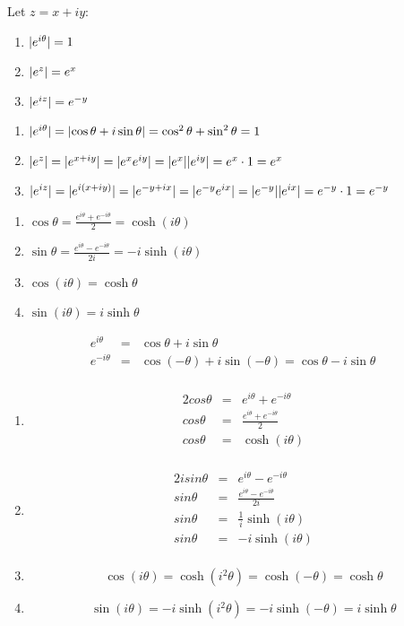 \documentclass[letterpaper,12pt,fleqn]{article}
\renewcommand{\o}{\theta}
\begin{document}
\begin{theorem}
Let $z=x+iy$:
\begin{enumerate}
\item $\abs{e^{i\o}}=1$
\item $\lvert e^z\rvert=e^x$
\item $\lvert e^{iz}\rvert=e^{-y}$
\end{enumerate}
\end{theorem}

\begin{theproof}
\listbreak
\begin{enumerate}
\item $\abs{e^{i\o}}=\abs{\cos\o+i\sin\o}=\cos^2\o+\sin^2\o=1$
\item $\lvert e^z\rvert=\lvert e^{x+iy}\rvert=\lvert e^xe^{iy}\rvert=\lvert e^x\rvert\lvert e^{iy}\rvert=e^x\cdot1
    =e^x$
\item $\lvert e^{iz}\rvert=\lvert e^{i(x+iy)}\rvert=\lvert e^{-y+ix}\rvert=\lvert e^{-y}e^{ix}\rvert=
    \lvert e^{-y}\rvert\lvert e^{ix}\rvert=e^{-y}\cdot1=e^{-y}$
\end{enumerate}
\end{theproof}
\newpage
\begin{theorem}
\listbreak
\begin{enumerate}
\item $\cos\o=\frac{e^{i\o}+e^{-i\o}}{2}=\cosh(i\o)$
\item $\sin\o=\frac{e^{i\o}-e^{-i\o}}{2i}=-i\sinh(i\o)$
\item $\cos(i\o)=\cosh\o$
\item $\sin(i\o)=i\sinh\o$
\end{enumerate}
\end{theorem}

\begin{theproof}
\listbreak
\begin{eqnarray*}
e^{i\o} &=& \cos\o+i\sin\o \\
e^{-i\o} &=& \cos(-\o)+i\sin(-\o)=\cos\o-i\sin\o \\
\end{eqnarray*}
\begin{enumerate}
\item
\begin{eqnarray*}
2cos\o &=& e^{i\o}+e^{-i\o} \\
cos\o &=& \frac{e^{i\o}+e^{-i\o}}{2} \\
cos\o &=& \cosh(i\o) \\
\end{eqnarray*}

\item
\begin{eqnarray*}
2isin\o &=& e^{i\o}-e^{-i\o} \\
sin\o &=& \frac{e^{i\o}-e^{-i\o}}{2i} \\
sin\o &=& \frac{1}{i}\sinh(i\o) \\
sin\o &=& -i\sinh(i\o) \\
\end{eqnarray*}

\item
\[\cos(i\o)=\cosh(i^2\o)=\cosh(-\o)=\cosh\o\]

\item
\[\sin(i\o)=-i\sinh(i^2\o)=-i\sinh(-\o)=i\sinh\o\]
\end{enumerate}
\end{theproof}
\end{document}
